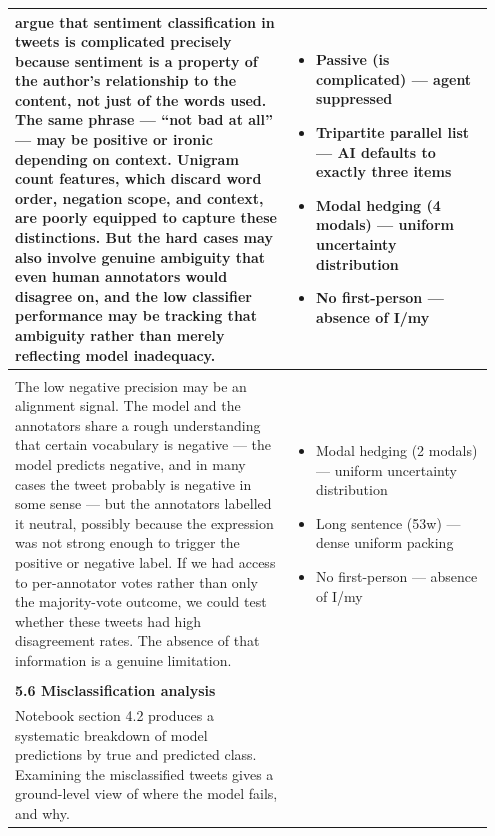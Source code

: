 \documentclass[11pt]{article}
\begin{document}
\begin{longtable}{|p{0.55\linewidth}|p{0.40\linewidth}|}
\hline
argue that sentiment classification in tweets is complicated precisely because sentiment is a property of the author's relationship to the content, not just of the words used. The same phrase --- ``not bad at all'' --- may be positive or ironic depending on context. Unigram count features, which discard word order, negation scope, and context, are poorly equipped to capture these distinctions. But the hard cases may also involve genuine ambiguity that even human annotators would disagree on, and the low classifier performance may be tracking that ambiguity rather than merely reflecting model inadequacy. & \begin{itemize}[leftmargin=1em,itemsep=1pt,topsep=1pt,parsep=0pt]
  \item Passive (is complicated) --- agent suppressed
  \item Tripartite parallel list --- AI defaults to exactly three items
  \item Modal hedging (4 modals) --- uniform uncertainty distribution
  \item No first-person --- absence of I/my
\end{itemize} \\[2pt]
\hline
\rule{0pt}{3.5cm} & \\
\hline
The low negative precision may be an alignment signal. The model and the annotators share a rough understanding that certain vocabulary is negative --- the model predicts negative, and in many cases the tweet probably is negative in some sense --- but the annotators labelled it neutral, possibly because the expression was not strong enough to trigger the positive or negative label. If we had access to per-annotator votes rather than only the majority-vote outcome, we could test whether these tweets had high disagreement rates. The absence of that information is a genuine limitation. & \begin{itemize}[leftmargin=1em,itemsep=1pt,topsep=1pt,parsep=0pt]
  \item Modal hedging (2 modals) --- uniform uncertainty distribution
  \item Long sentence (53w) --- dense uniform packing
  \item No first-person --- absence of I/my
\end{itemize} \\[2pt]
\hline
\rule{0pt}{3.5cm} & \\
\hline
\textbf{5.6 Misclassification analysis}\\[4pt]
Notebook section 4.2 produces a systematic breakdown of model predictions by true and predicted class. Examining the misclassified tweets gives a ground-level view of where the model fails, and why. & \begin{itemize}[leftmargin=1em,itemsep=1pt,topsep=1pt,parsep=0pt]

\end{itemize}
\end{longtable}
\end{document}
